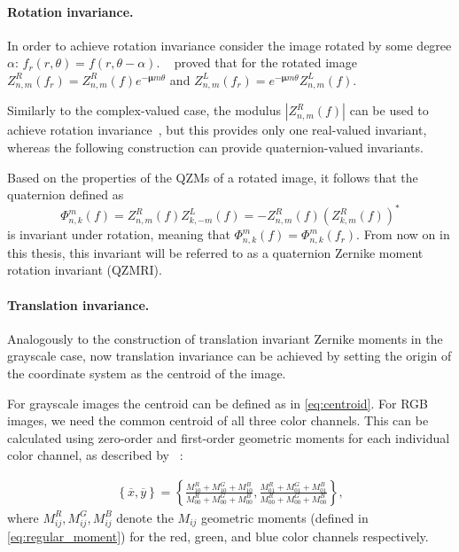 \paragraph{Rotation invariance.}
In order to achieve rotation invariance consider the image rotated by some degree $\alpha$: $f_{r}(r,\theta) = f(r, \theta - \alpha)$. \citeauthor{qzmi}~\cite{qzmi} proved that for the rotated image $Z_{n,m}^R(f_{r}) = Z_{n,m}^R(f)e^{-\bm{\mu}m\theta}$ and $Z_{n,m}^L(f_{r}) = e^{-\bm{\mu}m\theta}Z_{n,m}^L(f)$. 


Similarly to the complex-valued case, the modulus $|Z_{n,m}^R(f)|$ can be used to achieve rotation invariance~\cite{qzm}, but this provides only one real-valued invariant, whereas the following construction can provide quaternion-valued invariants. 


Based on the properties of the QZMs of a rotated image, it follows that the quaternion defined as
$$\Phi_{n,k}^m(f) = Z_{n,m}^R(f)Z_{k,-m}^L(f) = -Z_{n,m}^R(f)(Z_{k,m}^R(f))^*$$
is invariant under rotation, meaning that $\Phi_{n,k}^m(f) = \Phi_{n,k}^m(f_{r})$.
From now on in this thesis, this invariant will be referred to as a quaternion Zernike moment rotation invariant (QZMRI).

\paragraph{Translation invariance.}
Analogously to the construction of translation invariant Zernike moments in the grayscale case, now translation invariance can be achieved by setting the origin of the coordinate system as the centroid of the image.


For grayscale images the centroid can be defined as in \eqref{eq:centroid}. For RGB images, we need the common centroid of all three color channels. This can be calculated using zero-order and first-order geometric moments for each individual color channel, as described by \citeauthor{affine_color}~\cite{affine_color}:

\begin{gather} \label{eq:common_centroid}
    \left\{\overline{x}, \overline{y}\right\} = \left\{\frac{M_{10}^R + M_{10}^G + M_{10}^B}{M_{00}^R + M_{00}^G + M_{00}^B}, \frac{M_{01}^R + M_{01}^G + M_{01}^B}{M_{00}^R + M_{00}^G + M_{00}^B} \right\},
\end{gather}
where $M_{ij}^R, M_{ij}^G, M_{ij}^B$ denote the $M_{ij}$ geometric moments (defined in \eqref{eq:regular_moment}) for the red, green, and blue color channels respectively.


